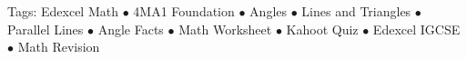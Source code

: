 \documentclass[11pt,a4paper]{article}
\begin{document}
\vspace{14pt}
\begin{center}
  \sffamily\scriptsize\textcolor{textmuted}{
    Tags: Edexcel Math $\bullet$ 4MA1 Foundation $\bullet$ Angles $\bullet$ Lines and Triangles $\bullet$ Parallel Lines $\bullet$ Angle Facts $\bullet$ Math Worksheet $\bullet$ Kahoot Quiz $\bullet$ Edexcel IGCSE $\bullet$ Math Revision
  }
\end{center}
\end{document}
